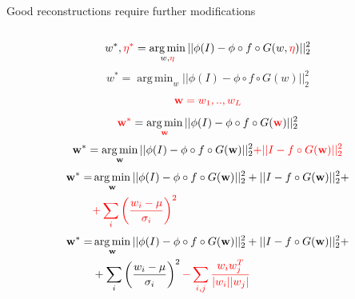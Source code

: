 \documentclass[8pt,xcolor=table,aspectratio=169]{beamer}
\DeclareMathOperator*{\argmin}{arg\,min}
\begin{document}
\begin{frame}{Good reconstructions require further modifications}
\begin{columns}
\begin{column}{0.5\textwidth}
\begin{overprint}
 \begin{equation*} w^*, \txc{\eta^*} = \argmin_{w,\txc{\eta}} || \phi(I) - \phi \circ f \circ G (w, \txc{\eta}) ||_2^2 \end{equation*}
 \begin{equation*} w^* = \argmin_{w} || \phi(I) - \phi \circ f \circ G (w) ||_2^2 \end{equation*}
 $$\mathbin{\textcolor{red}{\textbf{w} = w_1,..,w_L}}$$ \begin{equation*} \txc{\textbf{w}^*} = \argmin_{\txc{\textbf{w}}} || \phi(I) - \phi \circ f \circ G (\txc{\textbf{w}}) ||_2^2 \end{equation*}
 \begin{equation*} \textbf{w}^* = \argmin_{\textbf{w}} || \phi(I) - \phi \circ f \circ G (\textbf{w}) ||_2^2 \txc{+ || I - f \circ G (\textbf{w}) ||_2^2} \end{equation*}
 \begin{equation*} \begin{aligned} \textbf{w}^* = & \argmin_{\textbf{w}} || \phi(I) - \phi \circ f \circ G (\textbf{w}) ||_2^2 + || I - f \circ G (\textbf{w}) ||_2^2 + \\
& \txc{ + \sum_i \left(\frac{w_i-\mu}{\sigma_i}\right)^2} \end{aligned} \end{equation*}
 \begin{equation*} \begin{aligned} \textbf{w}^* = & \argmin_{\textbf{w}} || \phi(I) - \phi \circ f \circ G (\textbf{w}) ||_2^2 + || I - f \circ G (\textbf{w}) ||_2^2 + \\
& + \sum_i \left(\frac{w_i-\mu}{\sigma_i}\right)^2 \txc{- \sum_{i,j} \frac{w_iw_j^T}{|w_i| |w_j|}} \end{aligned} \end{equation*}


\end{overprint}
\end{column}
\end{columns}


\vspace{3em}


\begin{columns}
 \begin{column}{\textwidth}
  



\end{column}
\end{columns}
\end{frame}
\end{document}
